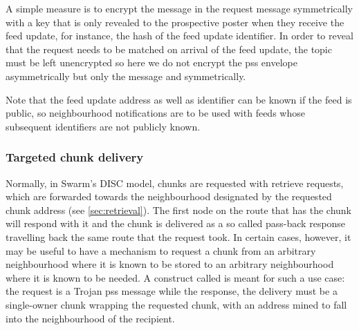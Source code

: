 A simple measure is to encrypt the message in the request  message  symmetrically with a key that is only revealed to the prospective poster when they receive the feed update,    for instance, the hash of the feed update identifier.
In order to reveal that the request needs to be matched on arrival of the feed update, the topic must be left unencrypted so here we do not encrypt the pss envelope asymmetrically but only the message and symmetrically.


   
Note that the feed update address as well as identifier can be known if the feed is public, so neighbourhood notifications are to be used with feeds whose subsequent identifiers are not publicly known.


\subsubsection{Targeted chunk delivery}

Normally, in Swarm's DISC model, chunks are requested with retrieve requests, which are forwarded towards the neighbourhood designated by the requested chunk address (see \ref{sec:retrieval}). The first node on the route that has the chunk will respond with it and the chunk is delivered  as a so called pass-back response travelling back  the same route that the request took. In certain cases, however, it may be useful to have a mechanism to request a chunk from an arbitrary neighbourhood where it is known to be stored to an arbitrary neighbourhood where it is known to be needed. A construct called  is meant for such a use case: the request is a Trojan pss message while the response, the delivery must be a single-owner chunk wrapping the requested chunk, with an address mined to fall into the neighbourhood of the  recipient.  


